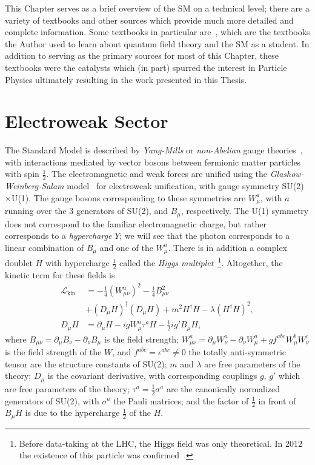 This Chapter serves as a brief overview of the SM on a technical level; there are a variety of textbooks and other sources which provide much more detailed and complete information.
Some textbooks in particular are~\cite{Schwartz:2013pla,Peskin:1995ev,Weinberg:1995mt,griffiths_particles}, which are the textbooks the Author used to learn about quantum field theory and the SM as a student.
In addition to serving as the primary sources for most of this Chapter, these textbooks were the catalysts which (in part) spurred the interest in Particle Physics ultimately resulting in the work presented in this Thesis.

\section{Electroweak Sector}
\label{sec:SM:EW}
The Standard Model is described by \textit{Yang-Mills} or \textit{non-Abelian} gauge theories~\cite{Yang:1954,Nobel1957}, with interactions mediated by vector bosons between fermionic matter particles with spin $\frac{1}{2}$.
The electromagnetic and weak forces are unified using the \textit{Glashow-Weinberg-Salam} model~\cite{Glashow:1959wxa,Salam:1968rm,Weinberg:1967tq,Nobel1979} for electroweak unification, with gauge symmetry SU(2)$\times$U(1).
The gauge bosons corresponding to these symmetries are $W_\mu^a$, with $a$ running over the $3$ generators of SU(2), and $B_\mu$, respectively.
The U(1) symmetry does not correspond to the familiar electromagnetic charge, but rather corresponds to a \textit{hypercharge} $Y$; we will see that the photon corresponds to a linear combination of $B_\mu$ and one of the $W_\mu^a$.
There is in addition a complex doublet $H$ with hypercharge $\frac{1}{2}$ called the \textit{Higgs multiplet}~\cite{Englert:1964et,Higgs:1964pj,Higgs:1964ia,Guralnik:1964eu,Nobel2013}\footnote{Before data-taking at the LHC, the Higgs field was only theoretical. In 2012 the existence of this particle was confirmed~\cite{HIGG-2012-27,CMS-HIG-12-028}.}.
Altogether, the kinetic term for these fields is
\begin{align}
  \mathcal{L}_\text{kin} &= -\frac{1}{4}(W_{\mu\nu}^a)^2 -\frac{1}{4}B_{\mu\nu}^2\nonumber\\
              &+(D_\mu H)^\dagger(D_\mu H) + m^2 H^\dagger H - \lambda (H^\dagger H)^2,\\
              D_\mu H &= \partial_\mu H - igW_\mu^a\tau^aH - \frac{1}{2}ig'B_\mu H,
\end{align}
where $B_{\mu\nu} = \partial_\mu B_\nu - \partial_\nu B_\mu$ is the field strength;
$W_{\mu\nu}^a = \partial_\mu W_\nu^a - \partial_\nu W_\mu^a + gf^{abc}W_\mu^bW_\nu^c$ is the field strength of the $W$, and $f^{abc} = \epsilon^{abc} \ne 0$ the totally anti-symmetric tensor are the structure constants of SU(2);
$m$ and $\lambda$ are free parameters of the theory;
$D_\mu$ is the covariant derivative, with corresponding couplings $g$, $g'$ which are free parameters of the theory;
$\tau^a = \frac{1}{2}\sigma^a$ are the canonically normalized generators of SU(2), with $\sigma^a$ the Pauli matrices;
and the factor of $\frac{1}{2}$ in front of $B_\mu H$ is due to the hypercharge $\frac{1}{2}$ of the $H$.

